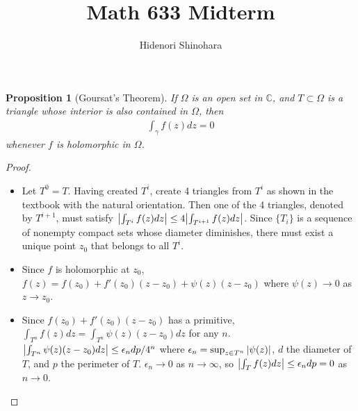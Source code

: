 \documentclass[12pt, psamsfonts]{amsart}
\newtheorem{prop}[thm]{Proposition}
\theoremstyle{definition}
\theoremstyle{remark}
\numberwithin{equation}{section}
\begin{document}
\title{Math 633 Midterm}
\author{Hidenori Shinohara}
\maketitle

\begin{prop}[Goursat's Theorem]
  If $\Omega$ is an open set in $\mathbb{C}$, and $T \subset \Omega$ is a triangle whose interior is also contained in $\Omega$, then
  \begin{align*}
    \int_{\gamma} f(z) dz = 0
  \end{align*}
  whenever $f$ is holomorphic in $\Omega$.
\end{prop}

\begin{proof}
$ $
  \begin{itemize}
    \item
      Let $T^0 = T$.
      Having created $T^i$, create 4 triangles from $T^i$ as shown in the textbook with the natural orientation.
      Then one of the 4 triangles, denoted by $T^{i + 1}$, must satisfy $\abs{\int_{T^i} f(z)dz} \leq 4\abs{\int_{T^{i + 1}} f(z)dz}$.
      Since $\{ T_i \}$ is a sequence of nonempty compact sets whose diameter diminishes, there must exist a unique point $z_0$ that belongs to all $T^i$.
    \item
      Since $f$ is holomorphic at $z_0$, $f(z) = f(z_0) + f'(z_0)(z - z_0) + \psi(z)(z - z_0)$ where $\psi(z) \rightarrow 0$ as $z \rightarrow z_0$.
    \item
      Since $f(z_0) + f'(z_0)(z - z_0)$ has a primitive, $\int_{T^n} f(z)dz = \int_{T^n}\psi(z)(z - z_0)dz$ for any $n$.
      $\abs{\int_{T^n}\psi(z)(z - z_0)dz} \leq \epsilon_ndp / 4^n$ where $\epsilon_n = \sup_{z \in T^n} \abs{\psi(z)}$, $d$ the diameter of $T$, and $p$ the perimeter of $T$.
      $\epsilon_n \rightarrow 0$ as $n \rightarrow \infty$, so $\abs{\int_{T} f(z)dz} \leq \epsilon_ndp = 0$ as $n \rightarrow 0$.
  \end{itemize}
\end{proof}
\end{document}
